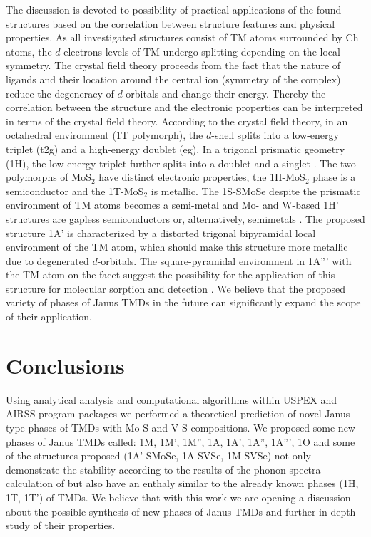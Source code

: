 \documentclass[a4paperm]{article}
\begin{document}
The discussion is devoted to possibility of practical applications of the found structures based on the correlation between structure features and physical properties. As all investigated structures consist of TM atoms surrounded by Ch atoms, the $d$-electrons levels of TM undergo splitting depending on the local symmetry. The crystal field theory proceeds from the fact that the nature of ligands and their location around the central ion (symmetry of the complex) reduce the degeneracy of $d$-orbitals and change their energy. Thereby the correlation between the structure and the electronic properties can be interpreted in terms of the crystal field theory.
According to the crystal field theory, in an octahedral environment (1T polymorph), the $d$-shell splits into a low-energy triplet (t2g) and a high-energy doublet (eg). In a trigonal prismatic geometry (1H), the low-energy triplet further splits into a doublet and a singlet \cite{pasquier2019crystal}. 
The two polymorphs of MoS$_2$ have distinct electronic properties, the 1H-MoS$_2$ phase is a semiconductor and the 1T-MoS$_2$ is metallic. The 1S-SMoSe despite the prismatic environment of TM atoms becomes a semi-metal \cite{lai2021catalytic, tang2021lattice} and Mo- and W-based 1H' structures are gapless semiconductors or, alternatively, semimetals \cite{ma2016two}. 
The proposed structure 1A' is characterized by a distorted trigonal bipyramidal local environment of the TM atom, which should make this structure more metallic due to degenerated $d$-orbitals. 
The square-pyramidal environment in 1A''' with the TM atom on the facet suggest the possibility for the application of this structure for molecular sorption and detection \cite{nano12050774}.
We believe that the proposed variety of phases of Janus TMDs in the future can significantly expand the scope of their application.

\section{Conclusions}
Using analytical analysis and computational algorithms within USPEX and AIRSS program packages we performed a theoretical prediction of novel Janus-type phases of TMDs with Mo-S and V-S compositions. We proposed some new phases of Janus TMDs called: 1M, 1M', 1M'', 1A, 1A', 1A'', 1A''', 1O and some of the structures proposed (1A'-SMoSe, 1A-SVSe, 1M-SVSe) not only demonstrate the stability according to the results of the phonon spectra calculation of but also have an enthaly similar to the already known phases (1H, 1T, 1T') of TMDs. We believe that with this work we are opening a discussion about the possible synthesis of new phases of Janus TMDs and further in-depth study of their properties.
\end{document}
